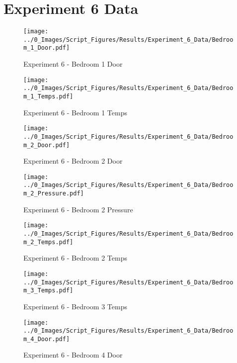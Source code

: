 \clearpage		\large
\section{Experiment 6 Data} \label{App:Exp6Results} 

	\begin{figure}[H]
		\centering
		\texttt{[image: ../0\_Images/Script\_Figures/Results/Experiment\_6\_Data/Bedroom\_1\_Door.pdf]}
		\caption[]{Experiment 6 - Bedroom 1 Door}
	\end{figure}
 

	\begin{figure}[H]
		\centering
		\texttt{[image: ../0\_Images/Script\_Figures/Results/Experiment\_6\_Data/Bedroom\_1\_Temps.pdf]}
		\caption[]{Experiment 6 - Bedroom 1 Temps}
	\end{figure}
 
	\clearpage

	\begin{figure}[H]
		\centering
		\texttt{[image: ../0\_Images/Script\_Figures/Results/Experiment\_6\_Data/Bedroom\_2\_Door.pdf]}
		\caption[]{Experiment 6 - Bedroom 2 Door}
	\end{figure}
 

	\begin{figure}[H]
		\centering
		\texttt{[image: ../0\_Images/Script\_Figures/Results/Experiment\_6\_Data/Bedroom\_2\_Pressure.pdf]}
		\caption[]{Experiment 6 - Bedroom 2 Pressure}
	\end{figure}
 
	\clearpage

	\begin{figure}[H]
		\centering
		\texttt{[image: ../0\_Images/Script\_Figures/Results/Experiment\_6\_Data/Bedroom\_2\_Temps.pdf]}
		\caption[]{Experiment 6 - Bedroom 2 Temps}
	\end{figure}
 

	\begin{figure}[H]
		\centering
		\texttt{[image: ../0\_Images/Script\_Figures/Results/Experiment\_6\_Data/Bedroom\_3\_Temps.pdf]}
		\caption[]{Experiment 6 - Bedroom 3 Temps}
	\end{figure}
 
	\clearpage

	\begin{figure}[H]
		\centering
		\texttt{[image: ../0\_Images/Script\_Figures/Results/Experiment\_6\_Data/Bedroom\_4\_Door.pdf]}
		\caption[]{Experiment 6 - Bedroom 4 Door}
	\end{figure}
 

